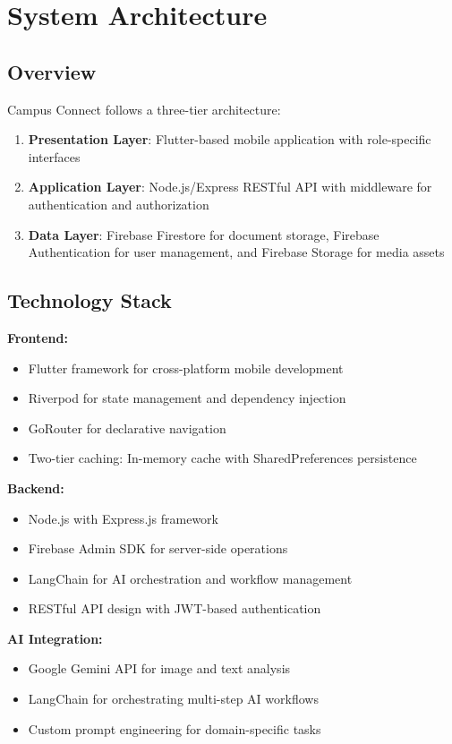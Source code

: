 \documentclass[12pt,a4paper]{article}
\begin{document}
\section{System Architecture}

\subsection{Overview}

Campus Connect follows a three-tier architecture:
\begin{enumerate}
    \item \textbf{Presentation Layer}: Flutter-based mobile application with role-specific interfaces
    \item \textbf{Application Layer}: Node.js/Express RESTful API with middleware for authentication and authorization
    \item \textbf{Data Layer}: Firebase Firestore for document storage, Firebase Authentication for user management, and Firebase Storage for media assets
\end{enumerate}

\subsection{Technology Stack}

\textbf{Frontend:}
\begin{itemize}
    \item Flutter framework for cross-platform mobile development
    \item Riverpod for state management and dependency injection
    \item GoRouter for declarative navigation
    \item Two-tier caching: In-memory cache with SharedPreferences persistence
\end{itemize}

\textbf{Backend:}
\begin{itemize}
    \item Node.js with Express.js framework
    \item Firebase Admin SDK for server-side operations
    \item LangChain for AI orchestration and workflow management
    \item RESTful API design with JWT-based authentication
\end{itemize}

\textbf{AI Integration:}
\begin{itemize}
    \item Google Gemini API for image and text analysis
    \item LangChain for orchestrating multi-step AI workflows
    \item Custom prompt engineering for domain-specific tasks
\end{itemize}
\end{document}
